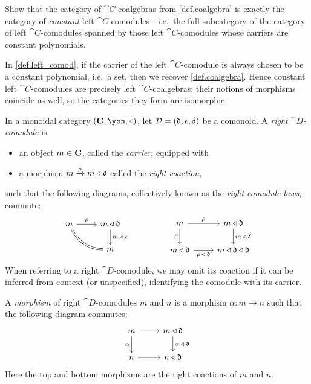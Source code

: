 \documentclass[Book-Poly]{subfiles}
\begin{document}
\begin{exercise} \label{exc.coalg_is_const_l_comod}
Show that the category of $\cat{C}$-coalgebras from \cref{def.coalgebra} is exactly the category of \textit{constant} left $\cat{C}$-comodules---i.e.\ the full subcategory of the category of left $\cat{C}$-comodules spanned by those left $\cat{C}$-comodules whose carriers are constant polynomials.
\begin{solution}
In \cref{def.left_comod}, if the carrier of the left $\cat{C}$-comodule is always chosen to be a constant polynomial, i.e.\ a set, then we recover \cref{def.coalgebra}.
Hence constant left $\cat{C}$-comodules are precisely left $\cat{C}$-coalgebras; their notions of morphisms coincide as well, so the categories they form are isomorphic.
\end{solution}
\end{exercise}

\begin{definition}\label{def.right_comod}
In a monoidal category $(\Cat{C},\yon,\tri)$, let $\mathcal{D}=(\mathfrak{d},\epsilon,\delta)$ be a comonoid.
A \emph{right $\cat{D}$-comodule} is
\begin{itemize}
    \item an object $m\in\mathbf{C}$, called the \emph{carrier}, equipped with
    \item a morphism $m\xrightarrow{\rho}m\mathbin{\triangleleft}\mathfrak{d}$ called the \emph{right coaction},
\end{itemize}
such that the following diagrams, collectively known as the \emph{right comodule laws}, commute:
\begin{equation} \label{eqn.right_comod_laws}
\begin{tikzcd}[ampersand replacement=\&]
	m\ar[r, "\rho"]\ar[dr, equal, bend right]\&
	m\tri\car{d}\ar[d, "m\:\tri\:\epsilon"]\\\&
	m
\end{tikzcd}
\hspace{.6in}
\begin{tikzcd}[ampersand replacement=\&]
	m\ar[r, "\rho"]\ar[d, "\rho"']\&
	m\tri\car{d}\ar[d, "m\:\tri\:\delta"]\\
	m\tri\car{d}\ar[r, "\rho\:\tri\:\car{d}"']\&
	m\tri\car{d}\tri\car{d}
\end{tikzcd}
\end{equation}
When referring to a right $\cat{D}$-comodule, we may omit its coaction if it can be inferred from context (or unspecified), identifying the comodule with its carrier.

A \emph{morphism} of right $\cat{D}$-comodules $m$ and $n$ is a morphism $\alpha\colon m\to n$ such that the following diagram commutes:
\[
\begin{tikzcd}
	m \ar[r] \ar[d, "\alpha"'] &
	m\tri\car{d} \ar[d, "\alpha\:\tri\:\car{d}"] \\
	n \ar[r] &
	n\tri\car{d}
\end{tikzcd}
\]
Here the top and bottom morphisms are the right coactions of $m$ and $n$.
\end{definition}
\end{document}
